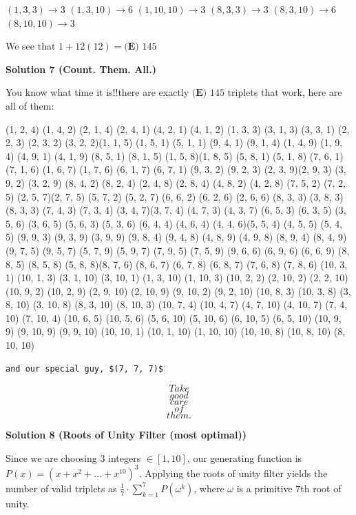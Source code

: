 \begin{enumerate}
 $(1, 3, 3) \rightarrow 3$
$(1, 3, 10) \rightarrow 6$
$(1, 10, 10) \rightarrow 3$
$(8, 3, 3) \rightarrow 3$
$(8, 3, 10) \rightarrow 6$
$(8, 10, 10) \rightarrow 3$

 We see that $1 + 12(12) = \boxed{\textbf{(E) }145}$




\textbf{Solution 7 (Count. Them. All.)}

You know what time it is!!there are exactly $\boxed{\textbf{(E) }145}$ triplets that work, here are all of them:

 (1, 2, 4) (1, 4, 2) (2, 1, 4) (2, 4, 1) (4, 2, 1) (4, 1, 2) (1, 3, 3) (3, 1, 3) (3, 3, 1) (2, 2, 3) (2, 3, 2) (3, 2, 2)(1, 1, 5) (1, 5, 1) (5, 1, 1) (9, 4, 1) (9, 1, 4) (1, 4, 9) (1, 9, 4) (4, 9, 1) (4, 1, 9) (8, 5, 1) (8, 1, 5) (1, 5, 8)(1, 8, 5) (5, 8, 1) (5, 1, 8) (7, 6, 1) (7, 1, 6) (1, 6, 7) (1, 7, 6) (6, 1, 7) (6, 7, 1) (9, 3, 2) (9, 2, 3) (2, 3, 9)(2, 9, 3) (3, 9, 2) (3, 2, 9) (8, 4, 2) (8, 2, 4) (2, 4, 8) (2, 8, 4) (4, 8, 2) (4, 2, 8) (7, 5, 2) (7, 2, 5) (2, 5, 7)(2, 7, 5) (5, 7, 2) (5, 2, 7) (6, 6, 2) (6, 2, 6) (2, 6, 6) (8, 3, 3) (3, 8, 3) (8, 3, 3) (7, 4, 3) (7, 3, 4) (3, 4, 7)(3, 7, 4) (4, 7, 3) (4, 3, 7) (6, 5, 3) (6, 3, 5) (3, 5, 6) (3, 6, 5) (5, 6, 3) (5, 3, 6) (6, 4, 4) (4, 6, 4) (4, 4, 6)(5, 5, 4) (4, 5, 5) (5, 4, 5) (9, 9, 3) (9, 3, 9) (3, 9, 9) (9, 8, 4) (9, 4, 8) (4, 8, 9) (4, 9, 8) (8, 9, 4) (8, 4, 9)(9, 7, 5) (9, 5, 7) (5, 7, 9) (5, 9, 7) (7, 9, 5) (7, 5, 9) (9, 6, 6) (6, 9, 6) (6, 6, 9) (8, 8, 5) (8, 5, 8) (5, 8, 8)(8, 7, 6) (8, 6, 7) (6, 7, 8) (6, 8, 7) (7, 6, 8) (7, 8, 6) (10, 3, 1) (10, 1, 3) (3, 1, 10) (3, 10, 1) (1, 3, 10) (1, 10, 3) (10, 2, 2) (2, 10, 2) (2, 2, 10) (10, 9, 2) (10, 2, 9) (2, 9, 10) (2, 10, 9) (9, 10, 2) (9, 2, 10) (10, 8, 3) (10, 3, 8) (3, 8, 10) (3, 10, 8) (8, 3, 10) (8, 10, 3) (10, 7, 4) (10, 4, 7) (4, 7, 10) (4, 10, 7) (7, 4, 10) (7, 10, 4) (10, 6, 5) (10, 5, 6) (5, 6, 10) (5, 10, 6) (6, 10, 5) (6, 5, 10) (10, 9, 9) (9, 10, 9) (9, 9, 10) (10, 10, 1) (10, 1, 10) (1, 10, 10) (10, 10, 8) (10, 8, 10) (8, 10, 10)

 \begin{verbatim}
and our special guy, $(7, 7, 7)$
\end{verbatim}


 \[Take\] 
 \[good\] 
 \[care\] 
 \[of\] 
 \[them.\]




\textbf{Solution 8 (Roots of Unity Filter (most optimal))}

Since we are choosing $3$ integers $\in [1,10]$, our generating function is $P(x)=(x+x^2+\dots+x^{10})^3$. Applying the roots of unity filter yields the number of valid triplets as $\frac{1}{7} \cdot \sum_{k=1}^{7} P(\omega^k)$, where $\omega$ is a primitive $7$th root of unity. 


\end{enumerate}
